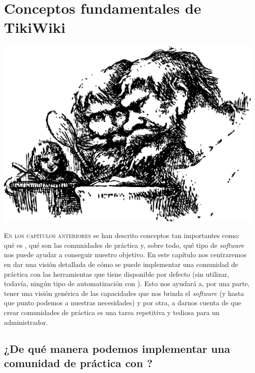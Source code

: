\chapter{Conceptos fundamentales de TikiWiki}
\label{chapter:conceptos-fundamentales-tiki}

\begin{center}
\includegraphics[scale=0.4]{../graphics/johnny_automatic_Jack_eating_with_the_giant.eps}
\end{center}

\lettrine{E}{n los capítulos anteriores} se han descrito conceptos tan importantes como: qué es \alma{}, qué son las comunidades de práctica y, sobre todo, qué tipo de \textit{software} nos puede ayudar a conseguir nuestro objetivo. En este capítulo nos centraremos en dar una visión detallada de cómo se puede implementar una comunidad de práctica con las herramientas que tiene disponible por defecto \tiki{} (sin utilizar, todavía, ningún tipo de automatización con \profiles{}). Esto nos ayudará a, por una parte, tener una visión genérica de las capacidades que nos brinda el \textit{software} (y hasta que punto podemos  a nuestras necesidades) y por otra, a darnos cuenta de que crear comunidades de práctica es una tarea repetitiva y tediosa para un administrador.

\section{¿De qué manera podemos implementar una comunidad de práctica con \tiki{}?}

